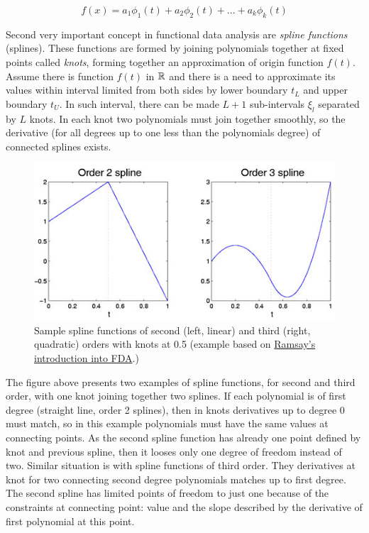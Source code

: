 \documentclass[energies,article,submit,pdftex,moreauthors]{Definitions/mdpi}
\begin{document}
\begin{linenomath}
\begin{equation}
f(x) = a_1 \phi_1(t) + a_2 \phi_2(t) + ... + a_k \phi_k(t)
\end{equation}
\end{linenomath}

Second very important concept in functional data analysis are \emph{spline functions} (splines). These functions are formed by joining polynomials together at fixed points called \emph{knots}, forming together an approximation of origin function $ f(t) $. Assume there is function $ f(t) $ in $ {\Bbb R} $ and there is a need to approximate its values within interval limited from both sides by lower boundary $ t_L $ and upper boundary $ t_U $. In such interval, there can be made $ L+1 $ sub-intervals $ \xi_l $ separated by $ L $ knots. In each knot two polynomials must join together smoothly, so the derivative (for all degrees up to one less than the polynomials degree) of connected splines exists.

\begin{figure}[H]
\includegraphics[width=10.5 cm]{images/splines_example.png}
\caption{Sample spline functions of second (left, linear) and third (right, quadratic) orders with knots at 0.5 (example based on \href{https://www.psych.mcgill.ca/misc/fda/ex-basis-b1.html}{Ramsay's introduction into FDA}.)}
\end{figure}
\unskip
\vspace{5mm}

The figure above presents two examples of spline functions, for second and third order, with one knot joining together two splines. If each polynomial is of first degree (straight line, order 2 splines), then in knots derivatives up to degree 0 must match, so in this example polynomials must have the same values at connecting points. As the second spline function has already one point defined by knot and previous spline, then it looses only one degree of freedom instead of two. Similar situation is with spline functions of third order. They derivatives at knot for two connecting second degree polynomials matches up to first degree. The second spline has limited points of freedom to just one because of the constraints at connecting point: value and the slope described by the derivative of first polynomial at this point.
\end{document}
